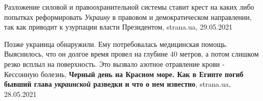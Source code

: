 Разложение силовой и правоохранительной системы ставит крест на каких либо
попытках реформировать \emph{Украину} в правовом и демократическом направлении, так
как приводит к узурпации власти Президентом, strana.ua, 29.05.2021

Позже украинца обнаружили. Ему потребовалась медицинская помощь. Выяснилось,
что он долгое время провел на глубине 40 метров, а потом слишком резко всплыл
на поверхность. Это вызвало азотное отравление крови - Кессонную болезнь,
\textbf{Черный день на Красном море. Как в Египте погиб бывший глава
\emph{украинской} разведки и что о нем известно}, strana.ua, 28.05.2021
